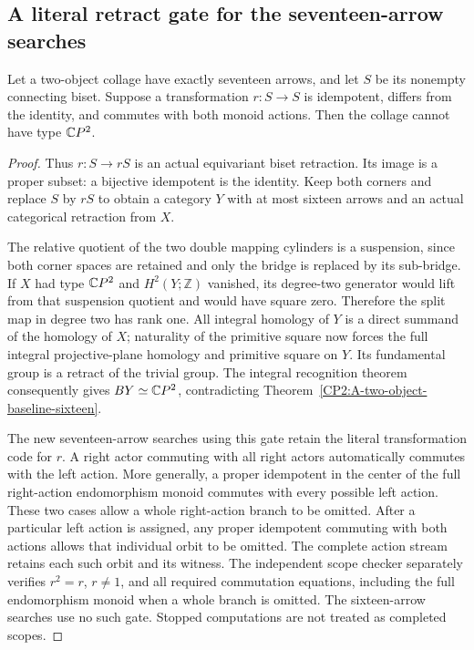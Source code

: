 \subsection{A literal retract gate for the seventeen-arrow searches}

\begin{lemma}
\label{CP2:A-seventeen-central-actor-retract}
Let a two-object collage have exactly seventeen arrows,
and let $S$ be its nonempty connecting biset. Suppose a
transformation $r:S\to S$ is idempotent, differs
from the identity, and commutes with both monoid actions. Then the collage cannot have type $\mathbb{C}P^2$.
\end{lemma}
\begin{proof}
Thus $r:S\to rS$ is an actual equivariant
biset retraction. Its image is a proper subset: a bijective
idempotent is the identity. Keep both corners and replace
$S$ by $rS$ to obtain a category $Y$ with at most sixteen
arrows and an actual categorical retraction from $X$.

The relative quotient of the two double mapping cylinders
is a suspension, since both corner spaces are retained
and only the bridge is replaced by its sub-bridge.
If $X$ had type $\mathbb{C}P^2$ and $H^2(Y;\mathbb Z)$ vanished,
its degree-two generator would lift from that suspension
quotient and would have square zero. Therefore the split
map in degree two has rank one. All integral homology
of $Y$ is a direct summand of the homology of $X$;
naturality of the primitive square now forces the full
integral projective-plane homology and primitive square
on $Y$. Its fundamental group is a retract of the trivial
group. The integral recognition theorem consequently
gives $BY\simeq\mathbb{C}P^2$, contradicting
Theorem~\ref{CP2:A-two-object-baseline-sixteen}.

The new seventeen-arrow searches using this gate retain
the literal transformation code for $r$. A right actor
commuting with all right actors automatically commutes
with the left action. More generally, a proper idempotent
in the center of the full right-action endomorphism monoid
commutes with every possible left action. These two cases
allow a whole right-action branch to be omitted. After
a particular left action is assigned, any proper idempotent
commuting with both actions allows that individual orbit
to be omitted. The complete action stream retains each
such orbit and its witness. The independent scope checker
separately verifies $r^2=r$, $r\ne1$, and all required
commutation equations, including the full endomorphism
monoid when a whole branch is omitted. The sixteen-arrow searches
use no such gate. Stopped computations are not treated
as completed scopes.
\end{proof}
